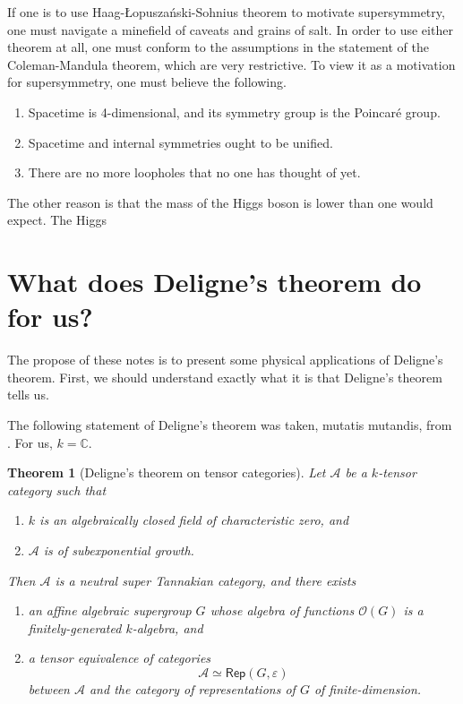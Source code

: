 \documentclass[a4paper]{report}
\newcommand{\C}{\mathbb{C}}
\theoremstyle{definition}
\theoremstyle{plain}
\newtheorem{theorem}{Theorem}[section]
\theoremstyle{remark}
\begin{document}
If one is to use Haag-{\L}opusza{\'n}ski-Sohnius theorem to motivate supersymmetry, one must navigate a minefield of caveats and grains of salt. In order to use either theorem at all, one must conform to the assumptions in the statement of the Coleman-Mandula theorem, which are very restrictive. To view it as a motivation for supersymmetry, one must believe the following.
\begin{enumerate}
  \item Spacetime is 4-dimensional, and its symmetry group is the Poincar{\'e} group.

  \item Spacetime and internal symmetries ought to be unified.

  \item There are no more loopholes that no one has thought of yet.
\end{enumerate}

The other reason is that the mass of the Higgs boson is lower than one would expect. The Higgs 

\section{What does Deligne's theorem do for us?}
The propose of these notes is to present some physical applications of Deligne's theorem. First, we should understand exactly what it is that Deligne's theorem tells us.

The following statement of Deligne's theorem was taken, mutatis mutandis, from \cite{nlab-deligne-theorem}. For us, $k = \C$.

\renewcommand{\thetheorem}{\ref*{thm:delignestheorem}}
\begin{theorem}[Deligne's theorem on tensor categories]
  Let $\mathscr{A}$ be a $k$-tensor category such that
  \begin{enumerate}
    \item $k$ is an algebraically closed field of characteristic zero, and

    \item $\mathscr{A}$ is of subexponential growth.
  \end{enumerate}

  Then $\mathscr{A}$ is a neutral super Tannakian category, and there exists 
  \begin{enumerate}
    \item an affine algebraic supergroup $G$ whose algebra of functions $\mathscr{O}(G)$ is a finitely-generated $k$-algebra, and 

    \item a tensor equivalence of categories
      \begin{equation*}
        \mathscr{A} \simeq \mathsf{Rep}(G, \varepsilon)
      \end{equation*}
      between $\mathscr{A}$ and the category of representations of $G$ of finite-dimension.
  \end{enumerate}
\end{theorem}
\renewcommand{\thetheorem}{\arabic{theorem}}
\end{document}

